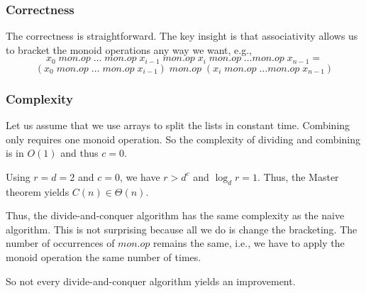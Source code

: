 \subsubsection{Correctness}

The correctness is straightforward.
The key insight is that associativity allows us to bracket the monoid operations any way we want, e.g.,
\[x_0 \;mon.op\;\ldots \;mon.op\; x_{i-1} \;mon.op\; x_i \;mon.op\; \ldots mon.op\; x_{n-1} =\]
\[(x_0 \;mon.op\; \ldots \;mon.op\; x_{i-1}) \;mon.op\; (x_i \;mon.op\; \ldots mon.op\; x_{n-1}) \]

\subsubsection{Complexity}

Let us assume that we use arrays to split the lists in constant time.
Combining only requires one monoid operation.
So the complexity of dividing and combining is in $O(1)$ and thus $c=0$.

Using $r=d=2$ and $c=0$, we have $r>d^c$ and $\log_d r=1$.
Thus, the Master theorem yields $C(n)\in\Theta(n)$.

Thus, the divide-and-conquer algorithm has the same complexity as the naive algorithm.
This is not surprising because all we do is change the bracketing.
The number of occurrences of $mon.op$ remains the same, i.e., we have to apply the monoid operation the same number of times.

So not every divide-and-conquer algorithm yields an improvement.
